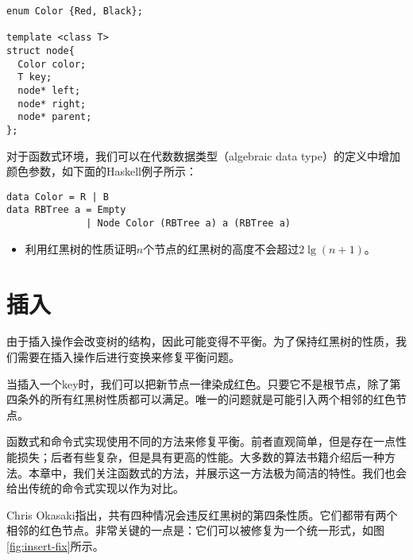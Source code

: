 \documentclass[UTF8]{article}
\begin{document}
\lstset{language=C++}
\begin{lstlisting}
enum Color {Red, Black};

template <class T>
struct node{
  Color color;
  T key;
  node* left;
  node* right;
  node* parent;
};
\end{lstlisting}

对于函数式环境，我们可以在代数数据类型（algebraic data type）的定义中增加颜色参数，如下面的Haskell例子所示：

\lstset{language=Haskell}
\begin{lstlisting}
data Color = R | B
data RBTree a = Empty
              | Node Color (RBTree a) a (RBTree a)
\end{lstlisting}

\begin{Exercise}

\begin{itemize}
\item 利用红黑树的性质证明$n$个节点的红黑树的高度不会超过$2 \lg (n+1)$。
\end{itemize}

\end{Exercise}

\section{插入}

由于插入操作会改变树的结构，因此可能变得不平衡。为了保持红黑树的性质，我们需要在插入操作后进行变换来修复平衡问题。

当插入一个key时，我们可以把新节点一律染成红色。只要它不是根节点，除了第四条外的所有红黑树性质都可以满足。唯一的问题就是可能引入两个相邻的红色节点。

函数式和命令式实现使用不同的方法来修复平衡。前者直观简单，但是存在一点性能损失；后者有些复杂，但是具有更高的性能。大多数的算法书籍介绍后一种方法。本章中，我们关注函数式的方法，并展示这一方法极为简洁的特性。我们也会给出传统的命令式实现以作为对比。

Chris Okasaki指出，共有四种情况会违反红黑树的第四条性质。它们都带有两个相邻的红色节点。非常关键的一点是：它们可以被修复为一个统一形式\cite{okasaki}，如图 \ref{fig:insert-fix}所示。
\end{document}
